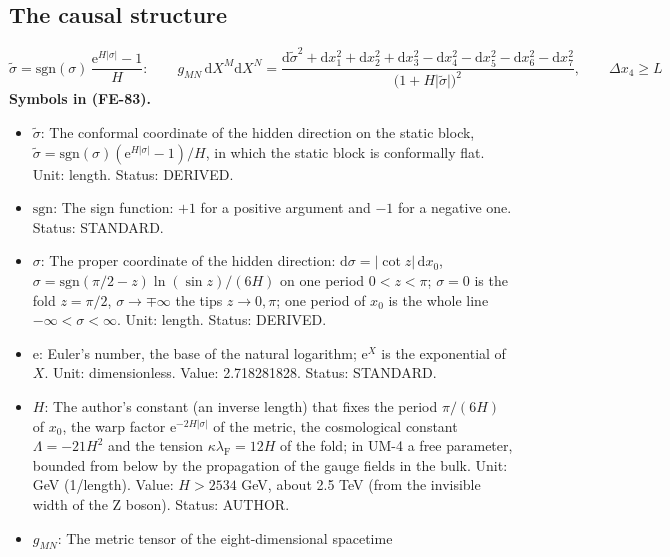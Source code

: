 \documentclass[
  10pt,
]{article}
\providecommand{\tightlist}{%
  \setlength{\itemsep}{0pt}\setlength{\parskip}{0pt}}
\begin{document}
\hypertarget{the-causal-structure}{%
\subsection{The causal structure}\label{the-causal-structure}}

\[
\tilde\sigma = \mathrm{sgn}(\sigma)\,\frac{\mathrm{e}^{H\lvert\sigma\rvert} - 1}{H}:\qquad
g_{MN}\,\mathrm{d}X^M\mathrm{d}X^N = \frac{\mathrm{d}\tilde\sigma^2 + \mathrm{d}x_1^2 + \mathrm{d}x_2^2 + \mathrm{d}x_3^2 - \mathrm{d}x_4^2
 - \mathrm{d}x_5^2 - \mathrm{d}x_6^2 - \mathrm{d}x_7^2}{\big(1 + H\lvert\tilde\sigma\rvert\big)^2},\qquad \Delta x_4 \ge L \tag{FE-83}
\] \textbf{Symbols in (FE-83).}

\begin{itemize}
\tightlist
\item
  \(\tilde\sigma\): The conformal coordinate of the hidden direction on
  the static block,
  \(\tilde\sigma = \mathrm{sgn}(\sigma)(\mathrm{e}^{H\lvert\sigma\rvert} - 1)/H\),
  in which the static block is conformally flat. Unit: length. Status:
  DERIVED.
\item
  \(\mathrm{sgn}\): The sign function: \(+1\) for a positive argument
  and \(-1\) for a negative one. Status: STANDARD.
\item
  \(\sigma\): The proper coordinate of the hidden direction:
  \(\mathrm{d}\sigma = \lvert\cot z\rvert\,\mathrm{d}x_0\),
  \(\sigma = \mathrm{sgn}(\pi/2 - z)\ln(\sin z)/(6H)\) on one period
  \(0 < z < \pi\); \(\sigma = 0\) is the fold \(z = \pi/2\),
  \(\sigma \to \mp\infty\) the tips \(z \to 0, \pi\); one period of
  \(x_0\) is the whole line \(-\infty < \sigma < \infty\). Unit: length.
  Status: DERIVED.
\item
  \(\mathrm{e}\): Euler's number, the base of the natural logarithm;
  \(\mathrm{e}^{X}\) is the exponential of \(X\). Unit: dimensionless.
  Value: 2.718281828. Status: STANDARD.
\item
  \(H\): The author's constant (an inverse length) that fixes the period
  \(\pi/(6H)\) of \(x_0\), the warp factor
  \(\mathrm{e}^{-2H\lvert\sigma\rvert}\) of the metric, the cosmological
  constant \(\Lambda = -21H^2\) and the tension
  \(\kappa\lambda_{\mathrm{F}} = 12H\) of the fold; in UM-4 a free
  parameter, bounded from below by the propagation of the gauge fields
  in the bulk. Unit: GeV (1/length). Value: \(H > 2534\) GeV, about 2.5
  TeV (from the invisible width of the Z boson). Status: AUTHOR.
\item
  \(g_{MN}\): The metric tensor of the eight-dimensional spacetime

\end{itemize}
\end{document}
